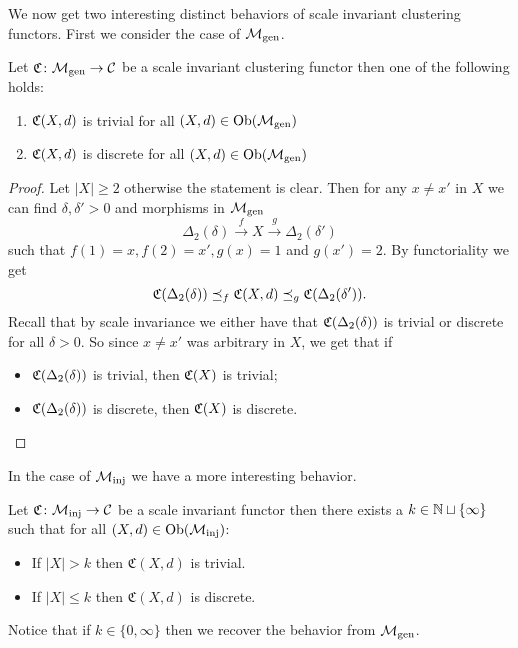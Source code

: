 We now get two interesting distinct behaviors of scale invariant clustering functors. First we consider the case of ${\mathcal{M}_\mathrm{gen}}$.

\begin{proposition}{\cite[Thm.~6.5]{Carlsson2010}}{}
    Let $\mathfrak{C}\colon {\mathcal{M}_\mathrm{gen}} \to \mathcal{C}$ be a scale invariant clustering functor then one of the following holds:
    \begin{enumerate}
        \item $\mathfrak{C}(X,d)$ is trivial for all $(X,d) \in \mathrm {Ob}({\mathcal{M}_\mathrm{gen}})$
        \item $\mathfrak{C}(X,d)$ is discrete for all $(X,d) \in \mathrm {Ob}({\mathcal{M}_\mathrm{gen}})$
    \end{enumerate}
\end{proposition}

\begin{proof}
    Let $|X| \ge 2$ otherwise the statement is clear.
    Then for any $x \neq x'$ in $X$ we can find $\delta, \delta' > 0$ and morphisms in ${\mathcal{M}_\mathrm{gen}}$
    $$
    \Delta_2(\delta) \overset{f}\longrightarrow X \overset{g}\longrightarrow \Delta_2(\delta')
    $$
    such that $f(1) = x, f(2) = x', g(x) = 1$ and $g(x') = 2$. By functoriality we get
    $$
    \mathfrak{C}(\Delta_2(\delta)) \preceq_f \mathfrak{C}(X,d) \preceq_g \mathfrak{C}(\Delta_2(\delta')).
    $$
    Recall that by scale invariance we either have that $\mathfrak{C}(\Delta_2(\delta))$ is trivial or discrete for all $\delta > 0$.
    So since $x \neq x'$ was arbitrary in $X$, we get that if
    \begin{itemize}
        \item $\mathfrak{C}(\Delta_2(\delta))$ is trivial, then $\mathfrak{C}(X)$ is trivial;
        \item $\mathfrak{C}(\Delta_2(\delta))$ is discrete, then $\mathfrak{C}(X)$ is discrete.
    \end{itemize}
\end{proof}
In the case of ${\mathcal{M}_\mathrm{inj}}$ we have a more interesting behavior.
\begin{proposition}{\cite[Thm.~6.6]{Carlsson2010}}{}
    Let $\mathfrak{C}\colon {\mathcal{M}_\mathrm{inj}} \to \mathcal{C}$ be a scale invariant functor then there exists a $k \in \mathbb N \sqcup \{\infty\}$ such that for all $(X,d) \in \mathrm {Ob}({\mathcal{M}_\mathrm{inj}})$:

    \begin{itemize}
        \item If $|X| > k$ then $\mathfrak{C}(X,d)$ is trivial.
        \item If $|X| \le k$ then $\mathfrak{C}(X,d)$ is discrete.
    \end{itemize}

    Notice that if $k \in \{0, \infty\}$ then we recover the behavior from ${\mathcal{M}_\mathrm{gen}}$.
\end{proposition}

